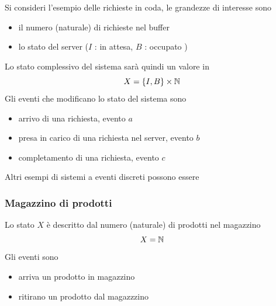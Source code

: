 \documentclass[10pt, letterpaper]{report}
\begin{document}
Si consideri l'esempio delle richieste in coda, le grandezze di interesse sono\begin{itemize}
    \item il numero (naturale) di richieste nel buffer 
    \item lo stato del server ($I$ : in attesa, $B$ : occupato )
\end{itemize}
Lo stato complessivo del sistema sarà quindi un valore in 
$$ X=\{I,B\}\times {\mathbb N}$$
Gli eventi che modificano lo stato del sistema sono \begin{itemize}
    \item arrivo di una richiesta, evento $a$
    \item presa in carico di una richiesta nel server, evento $b$
    \item completamento di una richiesta, evento $c$
\end{itemize}
Altri esempi di sistemi a eventi discreti possono essere 
\subsubsection{Magazzino di prodotti}
Lo stato $X$ è descritto dal numero (naturale) di prodotti nel magazzino $$ X={\mathbb N}$$
Gli eventi sono\begin{itemize}
    \item arriva un prodotto in magazzino 
    \item ritirano un prodotto dal magazzzino 
\end{itemize}
\end{document}
